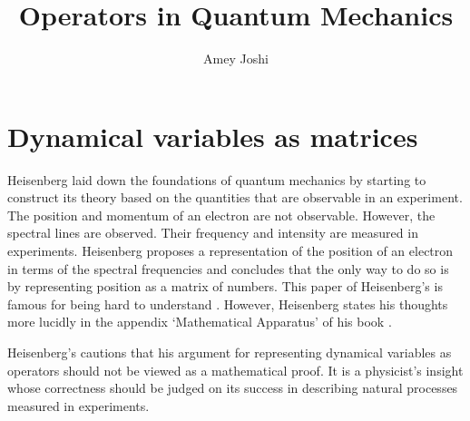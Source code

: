 \documentclass{article}
\title{Operators in Quantum Mechanics}
\author{Amey Joshi}
\begin{document}
\maketitle
{}

\section{Dynamical variables as matrices}
Heisenberg \cite{heisenberg1925quantum} laid down the foundations of quantum 
mechanics by starting to construct its theory based on the quantities that are 
observable in an experiment. The position and momentum of an electron are not 
observable.  However, the spectral lines are observed. Their frequency and 
intensity are measured in experiments. Heisenberg proposes a representation of
the position of an electron in terms of the spectral frequencies and concludes
that the only way to do so is by representing position as a matrix of numbers.
This paper of Heisenberg's is famous for being hard to understand
\cite{aitchison2004understanding}. However, Heisenberg states his thoughts more
lucidly in the appendix `Mathematical Apparatus' of his book 
\cite{heisenberg1949physical}.

Heisenberg's cautions \cite{heisenberg1949physical} that his argument for
representing dynamical variables as operators should not be viewed as a 
mathematical proof. It is a physicist's insight whose correctness should be
judged on its success in describing natural processes measured in experiments.
\end{document}
